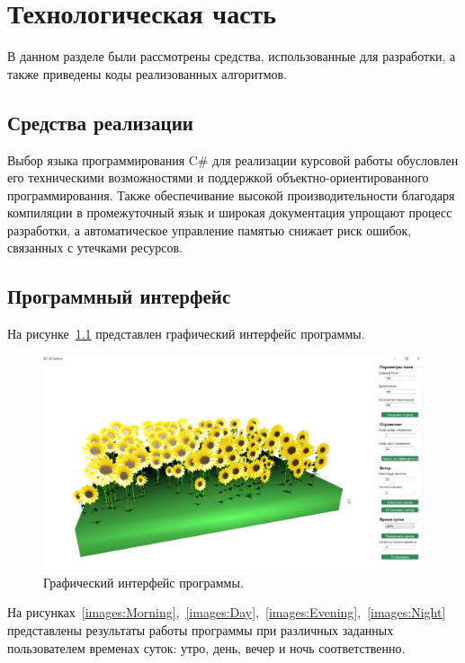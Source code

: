 \chapter{Технологическая часть}

В данном разделе были рассмотрены средства, использованные для разработки, а также приведены коды реализованных алгоритмов.

\section{Средства реализации}

Выбор языка программирования C\# для реализации курсовой работы обусловлен его техническими возможностями и поддержкой объектно-ориентированного программирования. Также обеспечивание высокой производительности благодаря компиляции в промежуточный язык и широкая документация упрощают процесс разработки, а автоматическое управление памятью снижает риск ошибок, связанных с утечками ресурсов. 


\section{Программный интерфейс}

На рисунке~\ref{images:morning} представлен графический интерфейс программы.

\begin{figure}[H]
    \centering
    \includegraphics[width=150mm]{images/morning}
    \caption{Графический интерфейс программы.}
    \label{images:morning}
\end{figure}

На рисунках~\ref{images:Morning},~\ref{images:Day},~\ref{images:Evening},~\ref{images:Night} представлены результаты работы программы при различных заданных пользователем временах суток: утро, день, вечер и ночь соответственно.

